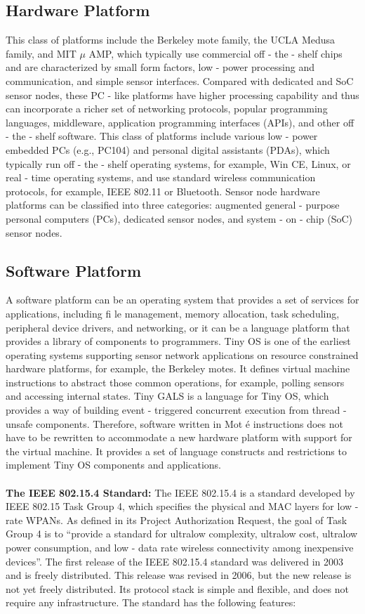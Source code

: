 \subsection{Hardware Platform}
This class of platforms include the Berkeley mote family, the UCLA Medusa family, and MIT $\mu$ AMP, which typically use commercial off - the - shelf chips and are characterized by small form factors, low - power processing and communication, and simple sensor interfaces. Compared with dedicated and SoC sensor nodes, these PC - like platforms have higher processing capability and thus can incorporate a richer set of networking protocols, popular programming languages, middleware, application programming interfaces (APIs), and other off - the - shelf software. This class of platforms include various low - power embedded PCs (e.g., PC104) and personal digital assistants (PDAs), which typically run off - the - shelf operating systems, for example, Win CE, Linux, or real - time operating systems, and use standard wireless communication protocols, for example, IEEE 802.11 or Bluetooth. Sensor node hardware platforms can be classified into three categories: augmented general - purpose personal computers (PCs), dedicated sensor nodes, and system - on - chip (SoC) sensor nodes.

\subsection{Software Platform}
A software platform can be an operating system that provides a set of services for applications, including fi le management, memory allocation, task scheduling, peripheral device drivers, and networking, or it can be a language platform that provides a library of components to programmers. Tiny OS is one of the earliest operating systems supporting sensor network applications on resource constrained hardware platforms, for example, the Berkeley motes. It defines virtual machine instructions to abstract those common operations, for example, polling sensors and accessing internal states. Tiny GALS is a language for Tiny OS, which provides a way of building event - triggered concurrent execution from thread - unsafe components. Therefore, software written in Mot é instructions does not have to be rewritten to accommodate a new hardware platform with support for the virtual machine. It provides a set of language constructs and restrictions to implement Tiny OS components and applications.\\\\
\textbf{The IEEE 802.15.4 Standard:} The IEEE 802.15.4 is a standard developed by IEEE 802.15 Task Group 4, which specifies the physical and MAC layers for low - rate WPANs. As defined in its Project Authorization Request, the goal of Task Group 4 is to “provide a standard for ultralow complexity, ultralow cost, ultralow power consumption, and low - data rate wireless connectivity among inexpensive devices”. The first release of the IEEE 802.15.4 standard was delivered in 2003 and is freely distributed. This release was revised in 2006, but the new release is not yet freely distributed. Its protocol stack is simple and flexible, and does not require any infrastructure. The standard has the following features:

